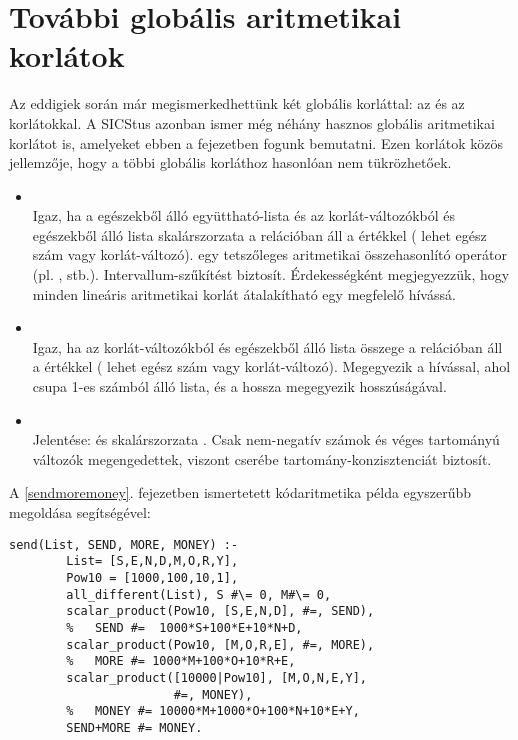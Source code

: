 \section{További globális aritmetikai korlátok}

Az eddigiek során már megismerkedhettünk két globális korláttal: az 
és az  korlátokkal. A SICStus azonban ismer még néhány hasznos
globális aritmetikai korlátot is, amelyeket ebben a fejezetben fogunk bemutatni. Ezen
korlátok közös jellemzője, hogy a többi globális korláthoz hasonlóan nem tükrözhetőek.

\begin{itemize}
\item {} \\
Igaz, ha a  egészekből álló együttható-lista és az  korlát-változókból
és egészekből álló lista skalárszorzata a  relációban áll a 
értékkel ( lehet egész szám vagy korlát-változó).  egy tetszőleges
aritmetikai összehasonlító operátor (pl. \cd{\#=}, \cd{\#<} stb.). Intervallum-szűkítést
biztosít. Érdekességként megjegyezzük, hogy minden lineáris aritmetikai korlát
átalakítható egy megfelelő  hívássá.

\item {} \\
Igaz, ha az  korlát-változókból és egészekből álló lista összege a 
relációban áll a  értékkel ( lehet egész szám vagy korlát-változó).
Megegyezik a  hívással, ahol 
csupa 1-es számból álló lista, és a hossza megegyezik  hosszúságával.

\item {} \\
Jelentése:  és  skalárszorzata . Csak nem-negatív
számok és véges tartományú változók megengedettek, viszont cserébe tartomány-konzisztenciát
biztosít.
\end{itemize}

A \ref{sendmoremoney}. fejezetben ismertetett kódaritmetika példa egyszerűbb megoldása
 segítségével:

\begin{verbatim}
send(List, SEND, MORE, MONEY) :-
        List= [S,E,N,D,M,O,R,Y],
        Pow10 = [1000,100,10,1],
        all_different(List), S #\= 0, M#\= 0,
        scalar_product(Pow10, [S,E,N,D], #=, SEND),
        %   SEND #=  1000*S+100*E+10*N+D,
        scalar_product(Pow10, [M,O,R,E], #=, MORE),
        %   MORE #= 1000*M+100*O+10*R+E,
        scalar_product([10000|Pow10], [M,O,N,E,Y],
                       #=, MONEY),
        %   MONEY #= 10000*M+1000*O+100*N+10*E+Y,
        SEND+MORE #= MONEY.
\end{verbatim}

